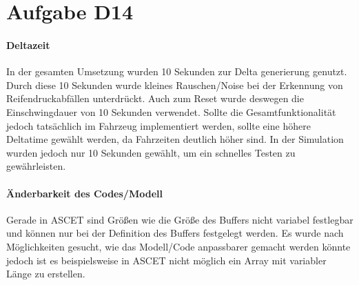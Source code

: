 \chapter{Aufgabe D14}
\subsubsection{Deltazeit}
In der gesamten Umsetzung wurden 10 Sekunden zur Delta generierung genutzt. Durch diese 10 Sekunden wurde kleines Rauschen/Noise bei der Erkennung von Reifendruckabfällen unterdrückt. Auch zum Reset wurde deswegen die Einschwingdauer von 10 Sekunden verwendet.
Sollte die Gesamtfunktionalität jedoch tatsächlich im Fahrzeug implementiert werden, sollte eine höhere Deltatime gewählt werden, da Fahrzeiten deutlich höher sind. In der Simulation wurden jedoch nur 10 Sekunden gewählt, um ein schnelles Testen zu gewährleisten.

\subsubsection{Änderbarkeit des Codes/Modell}
Gerade in ASCET sind Größen wie die Größe des Buffers nicht variabel festlegbar und können nur bei der Definition des Buffers festgelegt werden. Es wurde nach Möglichkeiten gesucht, wie das Modell/Code anpassbarer gemacht werden könnte jedoch ist es beispielsweise in ASCET nicht möglich ein Array mit variabler Länge zu erstellen. 
